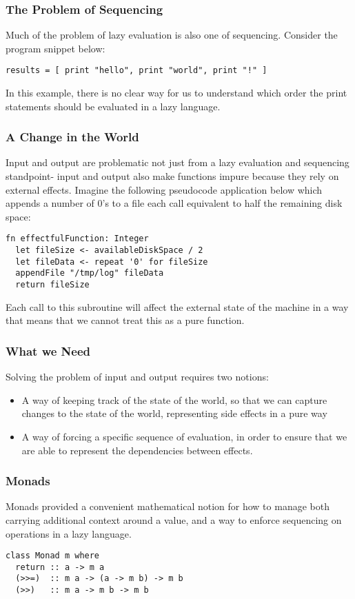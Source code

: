\documentclass{beamer}
\begin{document}
\begin{frame}[fragile]
  \frametitle{The Problem of Sequencing}
  Much of the problem of lazy evaluation is also one of sequencing.  Consider the program snippet below:
\begin{lstlisting}
results = [ print "hello", print "world", print "!" ]
\end{lstlisting}
  In this example, there is no clear way for us to understand which
  order the print statements should be evaluated in a lazy language.
\end{frame}

\begin{frame}[fragile]
  \frametitle{A Change in the World}
  Input and output are problematic not just from a lazy evaluation and
  sequencing standpoint- input and output also make functions impure
  because they rely on external effects.  Imagine the following
  pseudocode application below which appends a number of 0's to a file
  each call equivalent to half the remaining disk space:

\begin{lstlisting}
fn effectfulFunction: Integer
  let fileSize <- availableDiskSpace / 2
  let fileData <- repeat '0' for fileSize
  appendFile "/tmp/log" fileData
  return fileSize
\end{lstlisting}

  Each call to this subroutine will affect the external state of the
  machine in a way that means that we cannot treat this as a pure
  function.
\end{frame}
\begin{frame}
  \frametitle{What we Need}
  Solving the problem of input and output requires two notions:
  \begin{itemize}
  \item A way of keeping track of the state of the world, so that we
    can capture changes to the state of the world, representing side
    effects in a pure way
  \item A way of forcing a specific sequence of evaluation, in order
    to ensure that we are able to represent the dependencies between
    effects.
  \end{itemize}
\end{frame}

\begin{frame}[fragile]
  \frametitle{Monads}
  Monads provided a convenient mathematical notion for how to manage
  both carrying additional context around a value, and a way to
  enforce sequencing on operations in a lazy language.

\begin{lstlisting}
class Monad m where
  return :: a -> m a
  (>>=)  :: m a -> (a -> m b) -> m b
  (>>)   :: m a -> m b -> m b
\end{lstlisting}
\end{frame}
\end{document}
